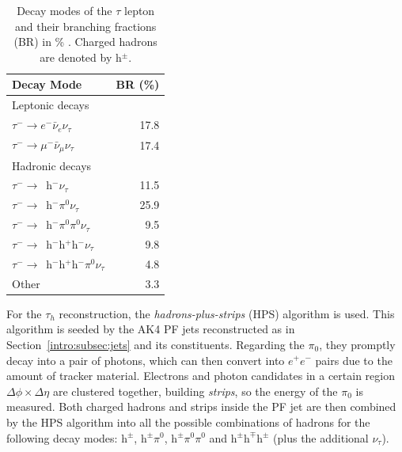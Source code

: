 \documentclass[../main.tex]{subfiles}
\begin{document}
\begin{table}
\begin{center}
\begin{tabular}{l  r}
Decay Mode & BR (\%)\\\hline\hline
Leptonic decays \\
$\tau^- \to e^-\bar{\nu}_e\nu_\tau$ & 17.8 \\
$\tau^- \to \mu^-\bar{\nu}_\mu\nu_\tau$ & 17.4 \\\hline
Hadronic decays \\
$\tau^- \to$~h${}^-\nu_\tau$ & 11.5 \\
$\tau^- \to$~h${}^-\pi^0\nu_\tau$ & 25.9 \\
$\tau^- \to$~h${}^-\pi^0\pi^0\nu_\tau$ & 9.5 \\
$\tau^- \to$~h${}^-$h${}^+$h${}^-\nu_\tau$ & 9.8 \\
$\tau^- \to$~h${}^-$h${}^+$h${}^-\pi^0\nu_\tau$ & 4.8 \\
Other & 3.3
\end{tabular}
\end{center}
\caption[$\tau$ lepton decay modes]{Decay modes of the $\tau$ lepton and their branching fractions (BR) in \% \cite{pdg}. Charged hadrons are denoted by h${}^\pm$.}
\label{id:tab:tau_decay}
\end{table}


For the $\tau_h$ reconstruction, the \textit{hadrons-plus-strips} (HPS) algorithm \cite{intro:id:hps} is used. This algorithm is seeded by the AK4 PF jets reconstructed as in Section~\ref{intro:subsec:jets} and its constituents. Regarding the $\pi_0$, they promptly decay into a pair of photons, which can then convert into $e^+e^-$ pairs due to the amount of tracker material. Electrons and photon candidates in a certain region $\Delta\phi\times\Delta\eta$ are clustered together, building \textit{strips}, so the energy of the $\pi_0$ is measured. Both charged hadrons and strips inside the PF jet are then combined by the HPS algorithm into all the possible combinations of hadrons for the following decay modes: $\text{h}^\pm$, $\text{h}^\pm\pi^0$, $\text{h}^\pm\pi^0\pi^0$ and $\text{h}^\pm \text{h}^\mp \text{h}^\pm$ (plus the additional $\nu_\tau$).
\end{document}
